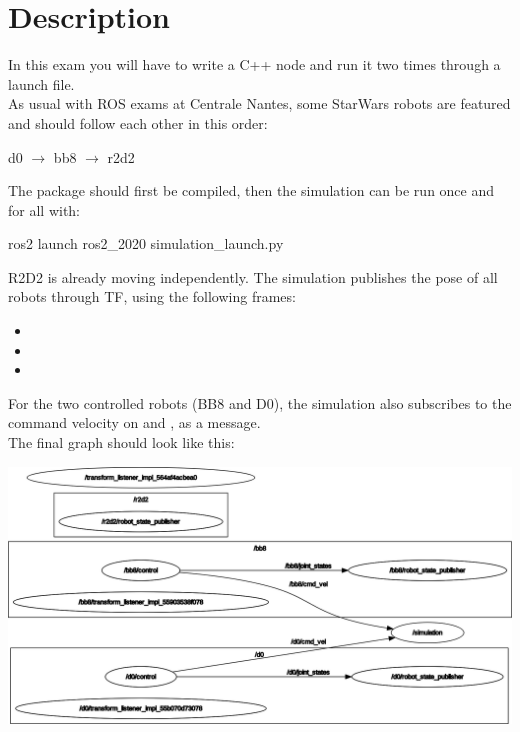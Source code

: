 \documentclass{ecnreport}
\begin{document}



\section{Description}

In this exam you will have to write a C++ node and run it two times through a launch file.\\
As usual with ROS exams at Centrale Nantes, some StarWars robots are featured and should follow each other in this order:
\begin{center}
 d0 $\rightarrow$ bb8 $\rightarrow$ r2d2
\end{center}

The package should first be compiled, then the simulation can be run once and for all with:
\begin{bashcodelarge}
 ros2 launch ros2_2020 simulation_launch.py
\end{bashcodelarge}


R2D2 is already moving independently. The simulation publishes the pose of all robots through TF, using the following frames:
\begin{itemize}
 \item {}
 \item {}
 \item {}
\end{itemize}

For the two controlled robots (BB8 and D0), the simulation also subscribes to the command velocity on  and , as a  message.\\
The final graph should look like this:
\begin{center}
 \includegraphics[width=.8\linewidth]{rosgraph}
\end{center}
\end{document}
